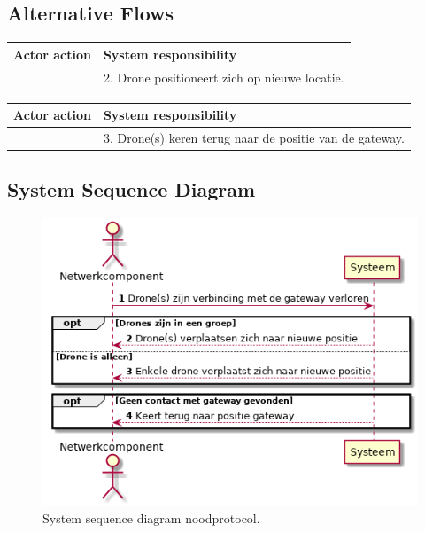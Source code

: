 \documentclass[a4paper, 11pt, oneside]{report}
\begin{document}
\subsection{Alternative Flows}


\begin{table}[H]
	\centering
	\begin{tabular}{|l|l|}
		\hline
		\rowcolor[HTML]{C0C0C0} 
		Actor action  & System responsibility   \\ \hline
	    &  2. Drone positioneert zich op nieuwe locatie.     \\ \hline
	\end{tabular}
\end{table}

\begin{table}[H]
	\centering
	\begin{tabular}{|l|l|}
		\hline
		\rowcolor[HTML]{C0C0C0} 
		Actor action  & System responsibility   \\ \hline
		&  3. Drone(s) keren terug naar de positie van de gateway. \\ \hline
	\end{tabular}
\end{table}

\subsection{System Sequence Diagram }
\label{Usecase:noodprotocol:systemsequence}

\begin{figure}[H]
	\begin{center}\includegraphics[height=.3\textheight]{UML/out/usecase/sequence/noodprotocol/noodprotocol.png}\end{center}
	\caption{System sequence diagram noodprotocol.}
	\label{fig:noodprotocol:systemsequence}
\end{figure}
\end{document}
